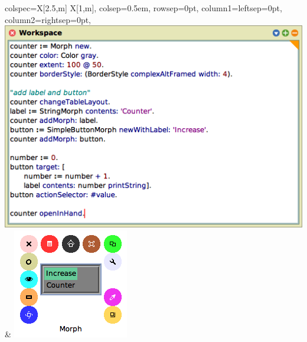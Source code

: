 \begin{center}
	\begin{tblr}{
		colspec={X[2.5,m] X[1,m]},
		colsep=0.5em,
		rowsep=0pt,
		column{1}={leftsep=0pt},
		column{2}={rightsep=0pt},
	}
		\includegraphics[width=\linewidth,valign=c]{01_suggestions/workspace_final.png} & %
		\includegraphics[width=\linewidth,valign=c]{01_suggestions/app_final.png} %
	\end{tblr}
\end{center}

